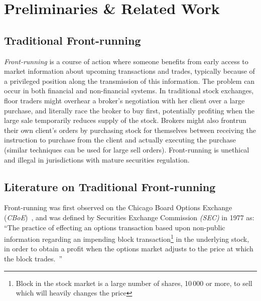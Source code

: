 \section{Preliminaries \& Related Work}

\subsection{Traditional Front-running} 
\label{sec:What is front-running?}

\emph{Front-running} is a course of action where someone benefits from early access to market information about upcoming transactions and trades, typically because of a privileged position along the transmission of this information. The problem can occur in both financial and non-financial systems. In traditional stock exchanges, floor traders might overhear a broker's negotiation with her client over a large purchase, and literally race the broker to buy first, potentially profiting when the large sale temporarily reduces supply of the stock. Brokers might also frontrun their own client's orders by purchasing stock for themselves between receiving the instruction to purchase from the client and actually executing the purchase (similar techniques can be used for large sell orders). Front-running is unethical and illegal in jurisdictions with mature securities regulation. 


\subsection{Literature on Traditional Front-running}\label{traditionalFrontrunning}
Front-running was first observed on the Chicago Board Options Exchange (\textit{CBoE})~\cite{markham1988front}, and was defined by Securities Exchange Commission \textit{(SEC)} in 1977 as: ``The practice of effecting an options transaction based upon non-public information regarding an impending block transaction\footnote{Block in the stock market is a large number of shares, 10\,000 or more, to sell which will heavily changes the price} in the underlying stock, in order to obtain a profit when the options market adjusts to the price at which the block trades.~\cite{sec1978optionsmarket}''


